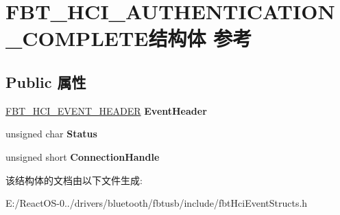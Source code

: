\hypertarget{struct_f_b_t___h_c_i___a_u_t_h_e_n_t_i_c_a_t_i_o_n___c_o_m_p_l_e_t_e}{}\section{F\+B\+T\+\_\+\+H\+C\+I\+\_\+\+A\+U\+T\+H\+E\+N\+T\+I\+C\+A\+T\+I\+O\+N\+\_\+\+C\+O\+M\+P\+L\+E\+T\+E结构体 参考}
\label{struct_f_b_t___h_c_i___a_u_t_h_e_n_t_i_c_a_t_i_o_n___c_o_m_p_l_e_t_e}
\subsection*{Public 属性}
\begin{DoxyCompactItemize}
\item 
\mbox{\label{struct_f_b_t___h_c_i___a_u_t_h_e_n_t_i_c_a_t_i_o_n___c_o_m_p_l_e_t_e_aafb56a0557501e603d2387ef487b1929}} 
\hyperlink{struct_f_b_t___h_c_i___e_v_e_n_t___h_e_a_d_e_r}{F\+B\+T\+\_\+\+H\+C\+I\+\_\+\+E\+V\+E\+N\+T\+\_\+\+H\+E\+A\+D\+ER} {\bfseries Event\+Header}
\item 
\mbox{\label{struct_f_b_t___h_c_i___a_u_t_h_e_n_t_i_c_a_t_i_o_n___c_o_m_p_l_e_t_e_a8b1b3256511da588190ae114a37167e1}} 
unsigned char {\bfseries Status}
\item 
\mbox{\label{struct_f_b_t___h_c_i___a_u_t_h_e_n_t_i_c_a_t_i_o_n___c_o_m_p_l_e_t_e_abb1271cd922da8457b9f95713bbb2d9c}} 
unsigned short {\bfseries Connection\+Handle}
\end{DoxyCompactItemize}


该结构体的文档由以下文件生成\+:\begin{DoxyCompactItemize}
\item 
E\+:/\+React\+O\+S-\/0../drivers/bluetooth/fbtusb/include/fbt\+Hci\+Event\+Structs.\+h\end{DoxyCompactItemize}
